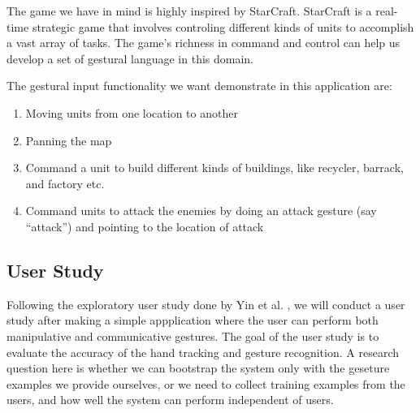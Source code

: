The game we have in mind is highly inspired by StarCraft. StarCraft is a
real-time strategic game that involves controling different kinds of units to
accomplish a vast array of tasks. The game's richness in command
and control can help us develop a set of gestural language in this domain.

The gestural input functionality we want demonstrate in this application are:

\begin{enumerate}
  \item Moving units from one location to another
  \item Panning the map
  \item Command a unit to build different kinds of buildings, like recycler,
  barrack, and factory etc.
  \item Command units to attack the enemies by doing an attack gesture (say
  ``attack'') and pointing to the location of attack
\end{enumerate}

\subsection{User Study}\label{sec:userStudy}
Following the exploratory user study done by Yin et al. \cite{yin10}, we will
conduct a user study after making a simple appplication where the user can
perform both manipulative and communicative gestures. The goal of the user study
is to evaluate the accuracy of the hand tracking and gesture recognition. A
research question here is whether we can bootstrap the system only with the
geseture examples we provide ourselves, or we need to collect training examples
from the users, and how well the system can perform independent of users.

